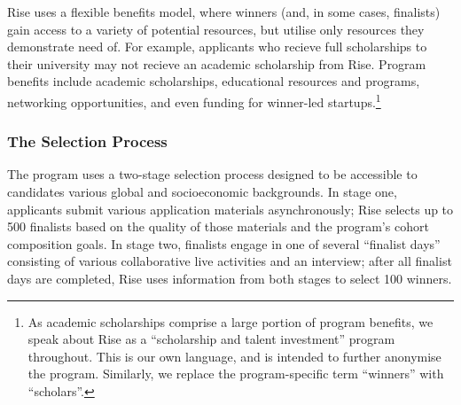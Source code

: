 Rise uses a flexible benefits model, where winners (and, in some cases, finalists) gain access to a variety of potential resources, but utilise only resources they demonstrate need of. For example, applicants who recieve full scholarships to their university may not recieve an academic scholarship from Rise. Program benefits include academic scholarships, educational resources and programs, networking opportunities, and even funding for winner-led startups.\footnote{As academic scholarships comprise a large portion of program benefits, we speak about Rise as a ``scholarship and talent investment'' program throughout. This is our own language, and is intended to further anonymise the program. Similarly, we replace the program-specific term ``winners'' with ``scholars''.}

\subsubsection{The Selection Process}
The program uses a two-stage selection process designed to be accessible to candidates various global and socioeconomic backgrounds. In stage one, applicants submit various application materials asynchronously; Rise selects up to 500 finalists based on the quality of those materials and the program's cohort composition goals. In stage two, finalists engage in one of several ``finalist days'' consisting of various collaborative live activities and an interview; after all finalist days are completed, Rise uses information from both stages to select 100 winners.


